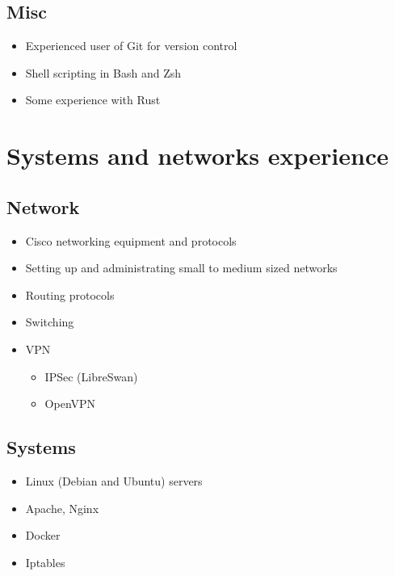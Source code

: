 \documentclass[a4paper, 11pt]{article}
\begin{document}
        \subsection*{Misc}
            \begin{itemize}
                \item Experienced user of Git for version control
                \item Shell scripting in Bash and Zsh
                \item Some experience with Rust
            \end{itemize}


    \section*{Systems and networks experience}

        \subsection*{Network}
            \begin{itemize}
                \item Cisco networking equipment and protocols
                \item Setting up and administrating small to medium sized networks
                \item Routing protocols
                \item Switching
                \item VPN
                \begin{itemize}
                    \item IPSec (LibreSwan)
                    \item OpenVPN
                \end{itemize}
            \end{itemize}

        \subsection*{Systems}
            \begin{itemize}
                \item Linux (Debian and Ubuntu) servers
                \item Apache, Nginx
                \item Docker
                \item Iptables
            \end{itemize}
\end{document}
